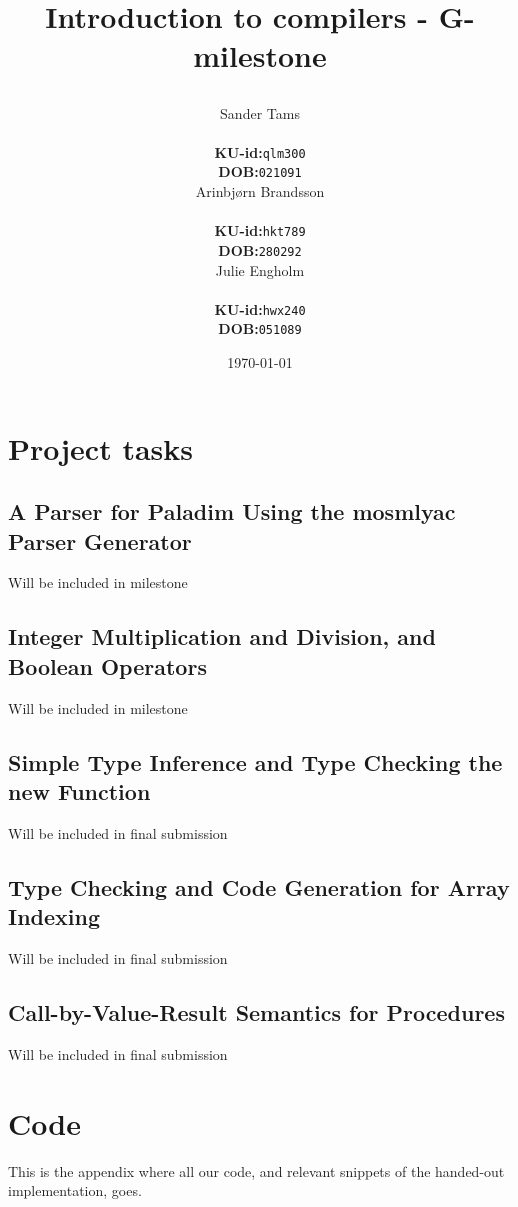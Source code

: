 \documentclass[11pt,a4paper,oneside,final]{article}
\title{%
    \vspace{2in}
    \begin{minipage}{\textwidth}
        \centering
        Introduction to compilers - G-milestone \\
    \end{minipage}
    \author{%
     \begin{minipage}{0.30\textwidth}
            \centering
            Sander Tams\\
            \begin{tabular}{l l}
                {\bf KU-id:}& {\tt qlm300}\\
                {\bf DOB:}  & {\tt 021091}
            \end{tabular}
        \end{minipage}
        \begin{minipage}{0.30\textwidth}
            \centering
            Arinbjørn Brandsson\\
            \begin{tabular}{l l}
                {\bf KU-id:}& {\tt hkt789}\\
                {\bf DOB:}  & {\tt 280292}
            \end{tabular}
        \end{minipage}
        \begin{minipage}{0.30\textwidth}
            \centering
            Julie Engholm\\
            \begin{tabular}{l l}
                {\bf KU-id:}& {\tt hwx240}\\
                {\bf DOB:}  & {\tt 051089}
            \end{tabular}
        \end{minipage}
    }
    \setcounter{page}{0}
    \date{\today}
}
\begin{document}
\maketitle
\thispagestyle{empty}
\newpage

\thispagestyle{psty:toc}
\tableofcontents
\setcounter{page}{0}
\newpage
\section{Project tasks}
\subsection{A Parser for Paladim Using the mosmlyac Parser Generator}

Will be included in milestone

\subsection{Integer Multiplication and Division, and Boolean Operators}

Will be included in milestone

\subsection{Simple Type Inference and Type Checking the new Function}

Will be included in final submission

\subsection{Type Checking and Code Generation for Array Indexing}

Will be included in final submission

\subsection{Call-by-Value-Result Semantics for Procedures}

Will be included in final submission

\appendix
\section{Code}
This is the appendix where all our code, and relevant snippets of the handed-out implementation, goes.
\end{document}

